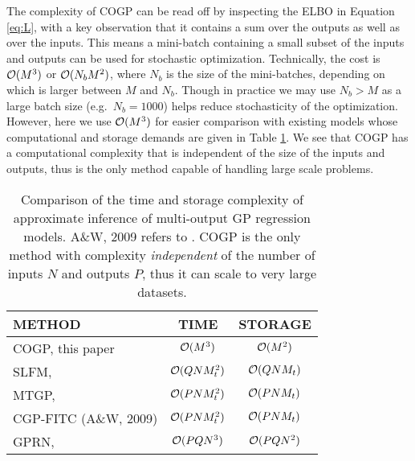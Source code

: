 The complexity of COGP can be read off by inspecting the ELBO  in Equation \eqref{eq:L}, with a key observation that it contains 
a sum over the outputs as well as over the inputs.
This means a mini-batch containing a small subset of the inputs and outputs can be used for stochastic optimization.
Technically, the cost is $\mathcal{O}(M^3)$ or $\mathcal{O}(N_bM^2)$, where $N_b$ is the size of the mini-batches, depending on which is larger between $M$ and $N_b$. 
Though in practice we may use $N_b > M$ as a large batch size (e.g.~$N_b = 1000$) helps reduce stochasticity of the optimization.
However, here we use $\mathcal{O}(M^3)$  for easier comparison with existing models whose computational and storage demands are 
given in Table \ref{tab:complexity}. 
We see that COGP has 
a computational  complexity that is independent of the size of the inputs and outputs, 
thus is the only method capable of handling large scale problems.
%
\setlength{\tabcolsep}{4pt}
\begin{table}[t]
\caption{Comparison of the time and storage complexity of approximate inference of  multi-output GP regression models. 
A\&W, 2009 refers to \citet{alvarez-lawrence-nips-08}. COGP is the only method with complexity \emph{independent} of the
 number of inputs $N$ and outputs $P$, thus it can scale to very large datasets.}
\label{tab:complexity}
\begin{center}
\small
\begin{tabular}{lcc}
\toprule
\textbf{METHOD} & \textbf{TIME} & \textbf{STORAGE} \\ \hline
COGP, this paper  & $\mathcal{O}(M^3)$ & $\mathcal{O}(M^2)$ \\
SLFM, \citep{teh-et-al-aistats-05} & $\mathcal{O}(QNM_t^{2})$ & $\mathcal{O}(QNM_t)$ \\
MTGP, \citep{bonilla-et-al-nips-08} & $\mathcal{O}(PNM_t^2)$ & $\mathcal{O}(PNM_t)$\\ 
CGP-FITC (A\&W, 2009)& $\mathcal{O}(PNM_t^2)$ & $\mathcal{O}(PNM_t)$ \\
GPRN, \citep{wilson-et-al-icml-12} & $\mathcal{O}(PQN^3)$ & $\mathcal{O}(PQN^2)$ \\
\bottomrule
\end{tabular}
\end{center}
\end{table}

